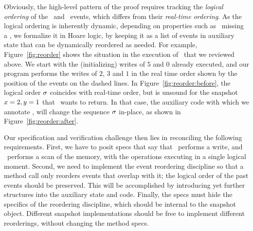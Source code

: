 Obviously, the high-level pattern of the proof requires tracking the
\emph{logical ordering} of the \jywrite\ and \jyscan\ events, which
differs from their \emph{real-time ordering}. As the logical ordering
is inherently dynamic, depending on properties such as
\jyscan\ missing a \jywrite, we formalize it in Hoare logic, by
keeping it as a list of events in auxiliary state that can be
dynamically reordered as needed. For example, Figure~\ref{fig:reorder}
shows the situation in the execution of \jyscan~that we reviewed
above. We start with the (initializing) writes of $5$ and $0$ already
executed, and our program performs the writes of $2$, $3$ and $1$ in
the real time order shown by the position of the events on the dashed
lines. In Figure~\ref{fig:reorder:before}, the logical order
$\sigma$ coincides with real-time order, but is unsound for the
snapshot $x=2, y=1$ that \jyscan~wants to return. In that case, the
auxiliary code with which we annotate \jyscan, will change the
sequence $\sigma$ in-place, as shown in
Figure~\ref{fig:reorder:after}.

Our specification and verification challenge then lies in reconciling
the following requirements. First, we have to posit specs that
say that \jywrite\ performs a write, and \jyscan\ performs a scan of
the memory, with the operations executing in a single logical
moment. Second, we need to implement the event reordering discipline
so that a method call only reorders events that overlap with it; the
logical order of the past events should be preserved. This will be
accomplished by introducing yet further structures into the auxiliary
state and code. Finally, the specs must hide the specifics of
the reordering discipline, which should be internal to the snapshot
object. Different snapshot implementations should be free to implement
different reorderings, without changing the method specs.




